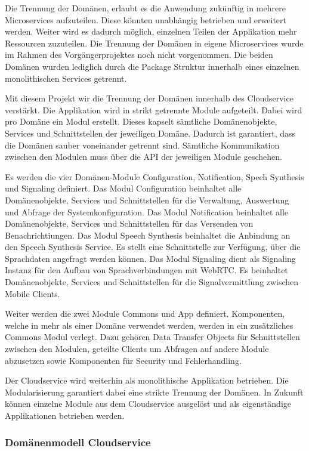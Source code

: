 Die Trennung der Domänen, erlaubt es die Anwendung zukünftig in mehrere Microservices aufzuteilen.
Diese könnten unabhängig betrieben und erweitert werden.
Weiter wird es dadurch möglich, einzelnen Teilen der Applikation mehr Ressourcen zuzuteilen.
Die Trennung der Domänen in eigene Microservices wurde im Rahmen des Vorgängerprojektes noch nicht vorgenommen.
Die beiden Domänen wurden lediglich durch die Package Struktur innerhalb eines einzelnen monolithischen Services getrennt.

Mit diesem Projekt wir die Trennung der Domänen innerhalb des Cloudservice verstärkt.
Die Applikation wird in strikt getrennte Module aufgeteilt.
Dabei wird pro Domäne ein Modul erstellt.
Dieses kapselt sämtliche Domänenobjekte, Services und Schnittstellen der jeweiligen Domäne.
Dadurch ist garantiert, dass die Domänen sauber voneinander getrennt sind.
Sämtliche Kommunikation zwischen den Modulen muss über die API der jeweiligen Module geschehen.

Es werden die vier Domänen-Module Configuration, Notification, Spech Synthesis und Signaling definiert.
Das Modul Configuration beinhaltet alle Domänenobjekte, Services und Schnittstellen für die Verwaltung, Auswertung und Abfrage der Systemkonfiguration.
Das Modul Notification beinhaltet alle Domänenobjekte, Services und Schnittstellen für das Versenden von Benachrichtiungen.
Das Modul Speech Synthesis beinhaltet die Anbindung an den Speech Synthesis Service.
Es stellt eine Schnittstelle zur Verfügung, über die Sprachdaten angefragt werden können.
Das Modul Signaling dient als Signaling Instanz für den Aufbau von Sprachverbindungen mit WebRTC\@.
Es beinhaltet Domänenobjekte, Services und Schnittstellen für die Signalvermittlung zwischen Mobile Clients.

Weiter werden die zwei Module Commons und App definiert.
Komponenten, welche in mehr als einer Domäne verwendet werden, werden in ein zusätzliches Commons Modul verlegt.
Dazu gehören Data Transfer Objects für Schnittstellen zwischen den Modulen, geteilte Clients um Abfragen auf andere Module abzusetzen sowie Komponenten für Security und Fehlerhandling.

Der Cloudservice wird weiterhin als monolithische Applikation betrieben.
Die Modularisierung garantiert dabei eine strikte Trennung der Domänen.
In Zukunft können einzelne Module aus dem Cloudservice ausgelöst und als eigenständige Applikationen betrieben werden.

\clearpage

\subsubsection{Domänenmodell Cloudservice}

